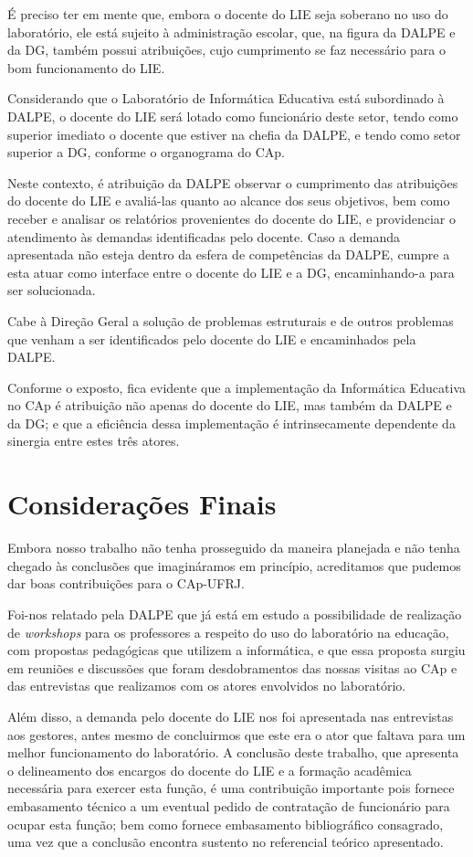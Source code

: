 É preciso ter em mente que, embora o docente do LIE seja soberano no uso do laboratório, ele está sujeito à administração escolar, que, na figura da DALPE e da DG, também possui atribuições, cujo cumprimento se faz necessário para o bom funcionamento do LIE.

Considerando que o Laboratório de Informática Educativa está subordinado à DALPE, o docente do LIE será lotado como funcionário deste setor, tendo como superior imediato o docente que estiver na chefia da DALPE, e tendo como setor superior a DG, conforme o organograma do CAp.

Neste contexto, é atribuição da DALPE observar o cumprimento das atribuições do docente do LIE e avaliá-las quanto ao alcance dos seus objetivos, bem como receber e analisar os relatórios provenientes do docente do LIE, e providenciar o atendimento às demandas identificadas pelo docente. Caso a demanda apresentada não esteja dentro da esfera de competências da DALPE, cumpre a esta atuar como interface entre o docente do LIE e a DG, encaminhando-a para ser solucionada.

Cabe à Direção Geral a solução de problemas estruturais e de outros problemas que venham a ser identificados pelo docente do LIE e encaminhados pela DALPE.

Conforme o exposto, fica evidente que a implementação da Informática Educativa no CAp é atribuição não apenas do docente do LIE, mas também da DALPE e da DG; e que a eficiência dessa implementação é intrinsecamente dependente da sinergia entre estes três atores.

\section{Considerações Finais}\label{chp:LABEL_CHP_CONC_SEC_CONS_FIN}

Embora nosso trabalho não tenha prosseguido da maneira planejada e não tenha chegado às conclusões que imagináramos em princípio, acreditamos que pudemos dar boas contribuições para o CAp-UFRJ.

Foi-nos relatado pela DALPE que já está em estudo a possibilidade de realização de \textit{workshops} para os professores a respeito do uso do laboratório na educação, com propostas pedagógicas que utilizem a informática, e que essa proposta surgiu em reuniões e discussões que foram desdobramentos das nossas visitas ao CAp e das entrevistas que realizamos com os atores envolvidos no laboratório.

Além disso, a demanda pelo docente do LIE nos foi apresentada nas entrevistas aos gestores, antes mesmo de concluirmos que este era o ator que faltava para um melhor funcionamento do laboratório. A conclusão deste trabalho, que apresenta o delineamento dos encargos do docente do LIE e a formação acadêmica necessária para exercer esta função, é uma contribuição importante pois fornece embasamento técnico a um eventual pedido de contratação de funcionário para ocupar esta função; bem como fornece embasamento bibliográfico consagrado, uma vez que a conclusão encontra sustento no referencial teórico apresentado.

